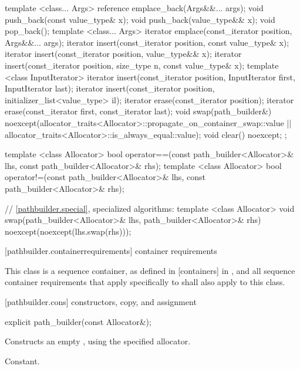 \begin{codeblock}
{{    template <class... Args>
    reference emplace_back(Args&&... args);
    void push_back(const value_type& x);
    void push_back(value_type&& x);
    void pop_back();
    template <class... Args>
    iterator emplace(const_iterator position, Args&&... args);
    iterator insert(const_iterator position, const value_type& x);
    iterator insert(const_iterator position, value_type&& x);
    iterator insert(const_iterator position, size_type n, const value_type& x);
    template <class InputIterator>
    iterator insert(const_iterator position, InputIterator first,
      InputIterator last);
    iterator insert(const_iterator position,
      initializer_list<value_type> il);
    iterator erase(const_iterator position);
    iterator erase(const_iterator first, const_iterator last);
    void swap(path_builder&)
      noexcept(allocator_traits<Allocator>::propagate_on_container_swap::value 
        || allocator_traits<Allocator>::is_always_equal::value);
    void clear() noexcept;
  };
  
  template <class Allocator>
  bool operator==(const path_builder<Allocator>& lhs, 
    const path_builder<Allocator>& rhs);
  template <class Allocator>
  bool operator!=(const path_builder<Allocator>& lhs, 
    const path_builder<Allocator>& rhs);
  
  // \ref{pathbuilder.special}, specialized algorithms:
  template <class Allocator>
  void swap(path_builder<Allocator>& lhs, path_builder<Allocator>& rhs)
    noexcept(noexcept(lhs.swap(rhs)));
}
\end{codeblock}

 [pathbuilder.containerrequirements] { container requirements}%

\pnum
This class is a sequence container, as defined in [containers] in \cppseventeen, and all sequence container requirements that apply specifically to  shall also apply to this class.

 [pathbuilder.cons] { constructors, copy, and assignment}%

%
\begin{itemdecl}
explicit path_builder(const Allocator&);
\end{itemdecl}
\begin{itemdescr}
\pnum
\effects
Constructs an empty , using the specified allocator.

\pnum
\complexity
Constant.
\end{itemdescr}

